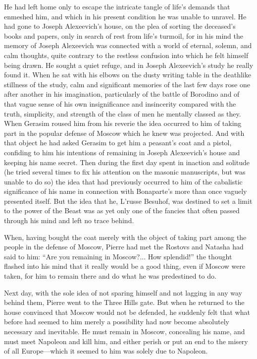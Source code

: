 He had left home only to escape the intricate tangle of life's
demands that enmeshed him, and which in his present condition he
was unable to unravel. He had gone to Joseph Alexeevich's house,
on the plea of sorting the deceased's books and papers, only in
search of rest from life's turmoil, for in his mind the memory of
Joseph Alexeevich was connected with a world of eternal, solemn,
and calm thoughts, quite contrary to the restless confusion into
which he felt himself being drawn. He sought a quiet refuge, and
in Joseph Alexeevich's study he really found it. When he sat with
his elbows on the dusty writing table in the deathlike stillness
of the study, calm and significant memories of the last few days
rose one after another in his imagination, particularly of the
battle of Borodino and of that vague sense of his own
insignificance and insincerity compared with the truth,
simplicity, and strength of the class of men he mentally classed
as they. When Gerasim roused him from his reverie the idea
occurred to him of taking part in the popular defense of Moscow
which he knew was projected. And with that object he had asked
Gerasim to get him a peasant's coat and a pistol, confiding to
him his intentions of remaining in Joseph Alexeevich's house and
keeping his name secret. Then during the first day spent in
inaction and solitude (he tried several times to fix his
attention on the masonic manuscripts, but was unable to do so)
the idea that had previously occurred to him of the cabalistic
significance of his name in connection with Bonaparte's more than
once vaguely presented itself. But the idea that he, L'russe
Besuhof, was destined to set a limit to the power of the Beast
was as yet only one of the fancies that often passed through his
mind and left no trace behind.

When, having bought the coat merely with the object of taking
part among the people in the defense of Moscow, Pierre had met
the Rostovs and Natasha had said to him: ``Are you remaining in
Moscow?... How splendid!''  the thought flashed into his mind
that it really would be a good thing, even if Moscow were taken,
for him to remain there and do what he was predestined to do.

Next day, with the sole idea of not sparing himself and not
lagging in any way behind them, Pierre went to the Three Hills
gate. But when he returned to the house convinced that Moscow
would not be defended, he suddenly felt that what before had
seemed to him merely a possibility had now become absolutely
necessary and inevitable. He must remain in Moscow, concealing
his name, and must meet Napoleon and kill him, and either perish
or put an end to the misery of all Europe---which it seemed to
him was solely due to Napoleon.

